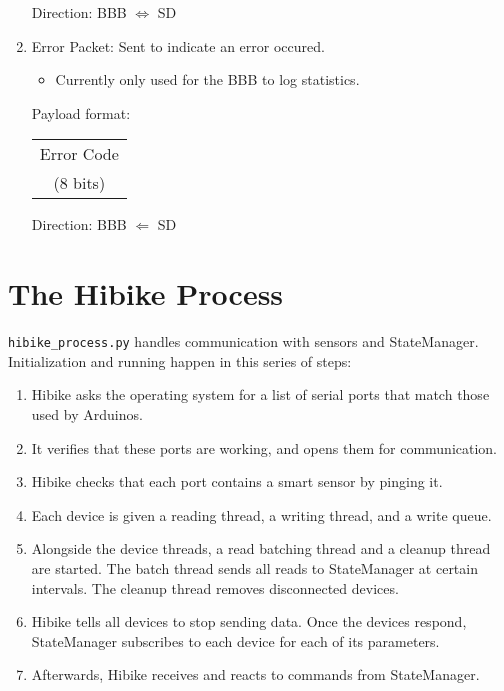 \documentclass[12pt]{book}
\begin{document}
\begin{enumerate}
\begin{center}
        \end{center}
        Direction: BBB $\Leftrightarrow$ SD
    \item Error Packet: Sent to indicate an error occured.
        \begin{itemize}
            \item Currently only used for the BBB to log statistics.
        \end{itemize}
        Payload format:
        \begin{center}
            \begin{tabular}{|c|}
                \hline
                Error Code\\
                (8 bits) \\
                \hline
            \end{tabular}
        \end{center}
        Direction: BBB $\Leftarrow$ SD

\end{enumerate}

\section{The Hibike Process}
\texttt{hibike\_process.py} handles communication with sensors and StateManager.
Initialization and running happen in this series of steps:
\begin{enumerate}
    \item Hibike asks the operating system for a list of serial ports that match
        those used by Arduinos.
    \item It verifies that these ports are working, and opens them for communication.
    \item Hibike checks that each port contains a smart sensor by pinging it.
    \item Each device is given a reading thread, a writing thread, and a write queue.
    \item Alongside the device threads, a read batching thread and a cleanup
        thread are started. The batch thread sends all reads to StateManager
        at certain intervals. The cleanup thread removes disconnected devices.
    \item Hibike tells all devices to stop sending data. Once the devices
        respond, StateManager subscribes to each device for each of
        its parameters.
    \item Afterwards, Hibike receives and reacts to commands from StateManager.
\end{enumerate}
\end{document}
